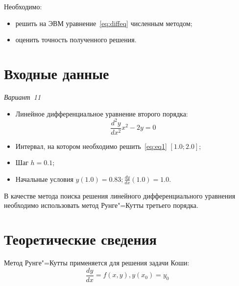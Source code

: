 \documentclass[a4paper,12pt,notitlepage,headsepline,pdftex]{scrartcl}
\begin{document}
  Необходимо:
  \begin{itemize}
    \item решить на ЭВМ уравнение~\eqref{eq:diffeq} численным методом;
    \item оценить точность полученного решения.
  \end{itemize}
\section{Входные данные}
  \hfill\emph{Вариант~11}

  \begin{itemize}
    \item Линейное дифференциальное уравнение второго порядка:
      \begin{equation}
        \frac{d^2 y}{d x^2} x^2 - 2y = 0
        \label{eq:eq1}
      \end{equation}
    \item Интервал, на котором необходимо решить~\eqref{eq:eq1} $\left[ 1.0;
        2.0 \right]$;
    \item Шаг $h = 0.1$;
    \item Начальные условия $y\left( 1.0 \right) = 0.83; \frac{d y}{d x}\left(
      1.0 \right) = 1.0$.
  \end{itemize}

  В качестве метода поиска решения линейного дифференциального уравнения
  необходимо использовать метод Рунге"=Кутты третьего порядка.
  \newpage
\section{Теоретические сведения}
  Метод Рунге"=Кутты применяется для решения задачи Коши:
  \begin{equation}
    \frac{d y}{d x} = f\left( x, y \right), y(x_0) = y_0
    \label{eq:cauchy}
  \end{equation}
\end{document}
